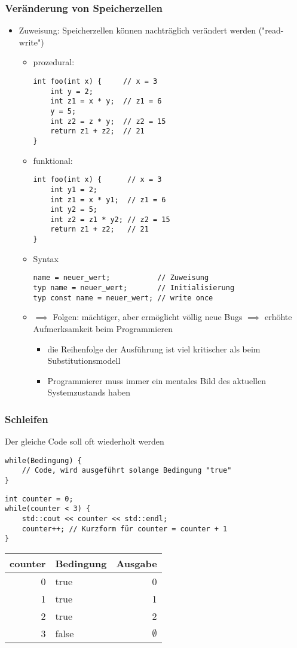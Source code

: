 \documentclass[a4paper]{scrartcl}
\theoremstyle{definition}
\theoremstyle{plain}
\theoremstyle{remark}
\theoremstyle{remark}
\begin{document}
\subsubsection{Veränderung von Speicherzellen}
\label{sec-7-2-3}
\begin{itemize}
\item Zuweisung: Speicherzellen können nachträglich verändert werden ("read-write")
\begin{itemize}
\item prozedural:
\begin{verbatim}
int foo(int x) {     // x = 3
	int y = 2;
	int z1 = x * y;  // z1 = 6
	y = 5;
	int z2 = z * y;  // z2 = 15
	return z1 + z2;  // 21
}
\end{verbatim}
\item funktional:
\begin{verbatim}
int foo(int x) {      // x = 3
	int y1 = 2;
	int z1 = x * y1;  // z1 = 6
	int y2 = 5;
	int z2 = z1 * y2; // z2 = 15
	return z1 + z2;   // 21
}
\end{verbatim}
\item Syntax
\begin{verbatim}
name = neuer_wert;           // Zuweisung
typ name = neuer_wert;       // Initialisierung
typ const name = neuer_wert; // write once
\end{verbatim}
\item $\implies$ Folgen: mächtiger, aber ermöglicht völlig neue Bugs $\implies$ erhöhte Aufmerksamkeit beim Programmieren
\begin{itemize}
\item die Reihenfolge der Ausführung ist viel kritischer als beim Substitutionsmodell
\item Programmierer muss immer ein mentales Bild des aktuellen Systemzustands haben
\end{itemize}
\end{itemize}
\end{itemize}
\subsubsection{Schleifen}
\label{sec-7-2-4}
Der gleiche Code soll oft wiederholt werden
\begin{verbatim}
while(Bedingung) {
	// Code, wird ausgeführt solange Bedingung "true"
}
\end{verbatim}
\begin{verbatim}
int counter = 0;
while(counter < 3) {
	std::cout << counter << std::endl;
	counter++; // Kurzform für counter = counter + 1
}
\end{verbatim}
\begin{center}
\begin{tabular}{rlr}
counter & Bedingung & Ausgabe\\
\hline
0 & true & 0\\
1 & true & 1\\
2 & true & 2\\
3 & false & $\emptyset$\\
\end{tabular}
\end{center}
\end{document}
